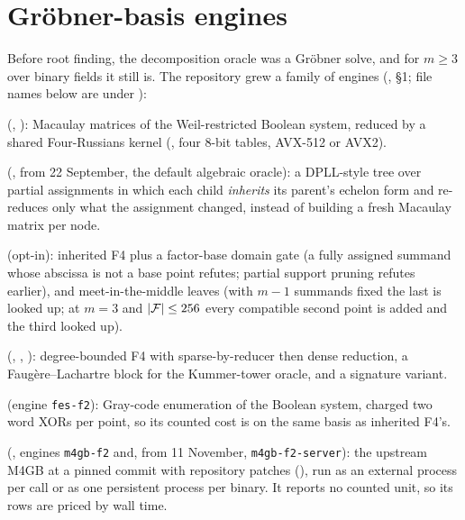 \chapter{Gr\"obner-basis engines}\label{sec:groebner}

Before root finding, the decomposition oracle was a Gr\"obner solve, and
for $m\ge3$ over binary fields it still is. The repository grew a family
of engines (, \S1; file names below are under ):

\begin{description}[style=nextline, leftmargin=1.4em]
\item[Matrix F4 and F5 over $\FF_2$] (,
  ): Macaulay matrices of the Weil-restricted Boolean
  system, reduced by a shared Four-Russians kernel (, four
  8-bit tables, AVX-512 or AVX2).
\item[Inherited F4] (, from 22 September, the
  default algebraic oracle): a DPLL-style tree over partial assignments in
  which each child \emph{inherits} its parent's echelon form and re-reduces
  only what the assignment changed, instead of building a fresh Macaulay
  matrix per node.
\item[F6-IC] (opt-in): inherited F4 plus a factor-base domain gate (a
  fully assigned summand whose abscissa is not a base point refutes;
  partial support pruning refutes earlier), and meet-in-the-middle leaves
  (with $m-1$ summands fixed the last is looked up; at $m=3$ and
  $\lvert \mathcal{F} \rvert\le256$ every compatible second point is added and the third
  looked up).
\item[$\FF_p$ F4] (, ,
  ): degree-bounded F4 with sparse-by-reducer then
  dense reduction, a Faug\`ere--Lachartre block for the Kummer-tower
  oracle, and a signature variant.
\item[Exhaustive search] (engine \texttt{fes-f2}): Gray-code enumeration of
  the Boolean system, charged two word XORs per point, so its counted cost
  is on the same basis as inherited F4's.
\item[M4GB] (, engines \texttt{m4gb-f2} and, from 11
  November, \texttt{m4gb-f2-server}): the upstream M4GB at a pinned commit
  with repository patches (), run as an
  external process per call or as one persistent process per binary. It
  reports no counted unit, so its rows are priced by wall time.
\end{description}
